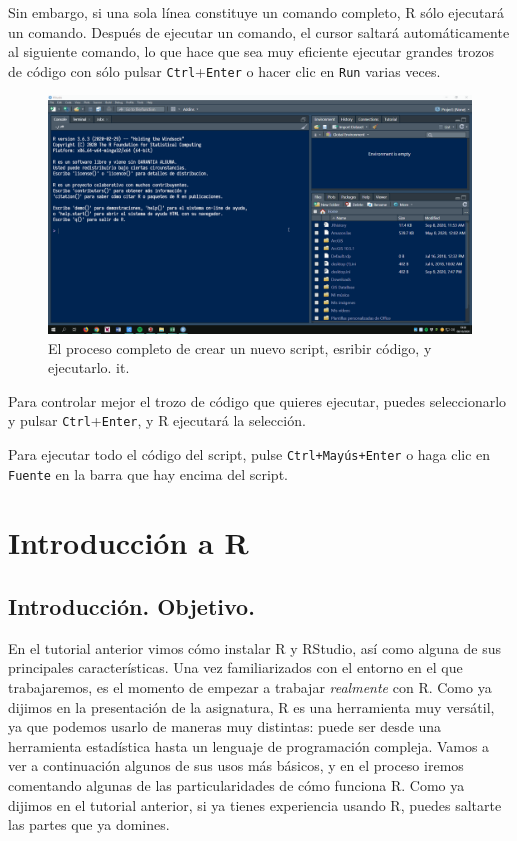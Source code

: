 \documentclass[
  letterpaper,
  DIV=11,
  numbers=noendperiod]{scrreprt}
\begin{document}
Sin embargo, si una sola línea constituye un comando completo, R sólo
ejecutará un comando. Después de ejecutar un comando, el cursor saltará
automáticamente al siguiente comando, lo que hace que sea muy eficiente
ejecutar grandes trozos de código con sólo pulsar
\texttt{Ctrl}+\texttt{Enter} o hacer clic en \texttt{Run} varias veces.

\begin{figure}

{\centering \includegraphics{images/01-intro-r/new_script.gif}

}

\caption{El proceso completo de crear un nuevo script, esribir código, y
ejecutarlo. it.}

\end{figure}

Para controlar mejor el trozo de código que quieres ejecutar, puedes
seleccionarlo y pulsar \texttt{Ctrl}+\texttt{Enter}, y R ejecutará la
selección.

Para ejecutar todo el código del script, pulse \texttt{Ctrl+Mayús+Enter}
o haga clic en \texttt{Fuente} en la barra que hay encima del script.

\hypertarget{sec-introR}{%
\chapter{Introducción a R}\label{sec-introR}}

\hypertarget{introducciuxf3n.-objetivo.-1}{%
\section{Introducción. Objetivo.}\label{introducciuxf3n.-objetivo.-1}}

En el tutorial anterior vimos cómo instalar R y RStudio, así como alguna
de sus principales características. Una vez familiarizados con el
entorno en el que trabajaremos, es el momento de empezar a trabajar
\emph{realmente} con R. Como ya dijimos en la presentación de la
asignatura, R es una herramienta muy versátil, ya que podemos usarlo de
maneras muy distintas: puede ser desde una herramienta estadística hasta
un lenguaje de programación compleja. Vamos a ver a continuación algunos
de sus usos más básicos, y en el proceso iremos comentando algunas de
las particularidades de cómo funciona R. Como ya dijimos en el tutorial
anterior, si ya tienes experiencia usando R, puedes saltarte las partes
que ya domines.
\end{document}
